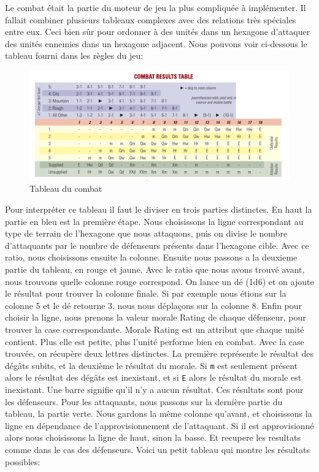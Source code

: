 Le combat était la partie du moteur de jeu la plus compliquée à implémenter.
Il fallait combiner plusieurs tableaux complexes avec des relations très spéciales entre eux.
Ceci bien sûr pour ordonner à des unités dans un hexagone d'attaquer des unités ennemies dans un hexagone adjacent.
Nous pouvons voir ci-dessous le tableau fourni dans les règles du jeu:

\begin{figure}[H]
\centering
\includegraphics[scale=0.25]{data/tableau_combat.png}
\caption{Tableau du combat}
\end{figure}

Pour interpréter ce tableau il faut le diviser en trois parties distinctes. En haut la partie en bleu est la première étape.
Nous choisissons la ligne correspondant au type de terrain de l'hexagone que nous attaquons, puis on divise le nombre
d'attaquants par le nombre de défenseurs présents dans l'hexagone cible. Avec ce ratio, nous choisissons ensuite la colonne.
Ensuite nous passons a la deuxieme partie du tableau, en rouge et jaune. Avec le ratio que nous avons trouvé avant,
nous trouvons quelle colonne rouge correspond. On lance un dé (1d6) et on ajoute le résultat pour trouver la colonne finale.
Si par exemple nous étions sur la colonne 5 et le dé retourne 3, nous nous déplaçons sur la colonne 8.
Enfin pour choisir la ligne, nous prenons la valeur morale Rating de chaque défenseur, pour trouver la case correspondante.
Morale Rating est un attribut que chaque unité contient. Plus elle est petite, plus l'unité performe bien en combat.
Avec la case trouvée, on récupère deux lettres distinctes. La première représente le résultat des dégâts subits, et la deuxième le résultat du morale.
Si {\tt m} est seulement présent alors le résultat des dégâts est inexistant, et si {\tt E} alors le résultat du morale est inexistant.
Une barre signifie qu'il n'y a aucun résultat. Ces résultats sont pour les défenseurs.
Pour les attaquants, nous passons sur la dernière partie du tableau, la partie verte.
Nous gardons la même colonne qu'avant, et choisissons la ligne en dépendance de l'approvisionnement de l'attaquant.
Si il est approvisionné alors nous choisissons la ligne de haut, sinon la basse. Et recupere les resultats comme dans le cas des défenseurs.
Voici un petit tableau qui montre les résultats possibles:

